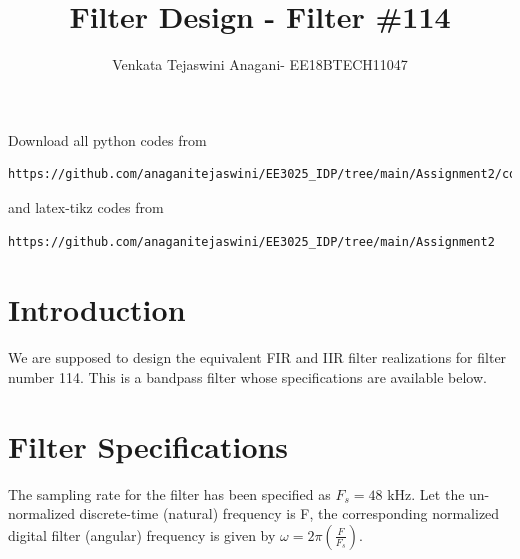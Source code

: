 \documentclass[journal,12pt,twocolumn]{IEEEtran}
\begin{document}
     \def\rightbox#1{\makebox[0in][r]{#1}}
     \def\centbox#1{\makebox[0in]{#1}}
     \def\topbox#1{\raisebox{-\baselineskip}[0in][0in]{#1}}
     \def\midbox#1{\raisebox{-0.5\baselineskip}[0in][0in]{#1}}
\vspace{3cm}
\title{Filter Design - Filter \#114}
\author{Venkata Tejaswini Anagani- EE18BTECH11047}
\maketitle
\newpage
\bigskip
\renewcommand{\thefigure}{\theenumi}
\renewcommand{\thetable}{\theenumi}
Download all python codes from 
\begin{lstlisting}
https://github.com/anaganitejaswini/EE3025_IDP/tree/main/Assignment2/codes
\end{lstlisting}
%
and latex-tikz codes from 
%
\begin{lstlisting}
https://github.com/anaganitejaswini/EE3025_IDP/tree/main/Assignment2
\end{lstlisting}
\section{Introduction}
We are supposed to design the equivalent FIR and IIR filter realizations for filter number 114.  
This is a bandpass filter whose specifications are available below.
\section{Filter Specifications}
The sampling rate for the filter has been specified as $F_s =  48$ kHz. Let the un-normalized  discrete-time (natural) frequency is F, the corresponding normalized digital filter (angular) frequency is given by $\omega = 2\pi
\left(\frac{F}{F_s}\right)$.
\end{document}
